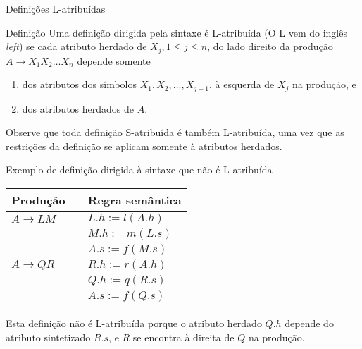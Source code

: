 \begin{frame}[fragile]{Definições L-atribuídas}

    \begin{block}{Definição}
        Uma definição dirigida pela sintaxe é L-atribuída (O L vem do inglês \textit{left}) se cada atributo herdado de $X_j, 1\leq j\leq n$, do lado direito da
        produção $A\to X_1X_2\ldots X_n$ depende somente
        \begin{enumerate}
            \item dos atributos dos símbolos $X_1, X_2, \ldots, X_{j - 1}$, à esquerda de $X_j$ na produção, e
            \item dos atributos herdados de $A$.
        \end{enumerate}
    \end{block}

    \vspace{0.2in}

    Observe que toda definição S-atribuída é também L-atribuída, uma vez que as restrições da definição se aplicam somente à atributos herdados.

\end{frame}

\begin{frame}[fragile]{Exemplo de definição dirigida à sintaxe que não é L-atribuída}

    \begin{table}[h]
        \begin{tabular}{lp{2cm}l}
            \toprule
            \textbf{Produção} & & \textbf{Regra semântica} \\
            \midrule
            $A\to LM$ & & $L.h := l(A.h)$ \\
            & & $M.h := m(L.s) $ \\
            & & $A.s := f(M.s) $ \\
            \midrule
            $A\to QR$ & & $R.h := r(A.h)$ \\
            & & $Q.h := q(R.s)$ \\
            & & $A.s := f(Q.s)$ \\
            \bottomrule
        \end{tabular}
    \end{table}

    \vspace{0.2in}

    Esta definição não é L-atribuída porque o atributo herdado $Q.h$ depende do atributo sintetizado $R.s$, e $R$ se encontra à direita de $Q$ na produção.
\end{frame}

